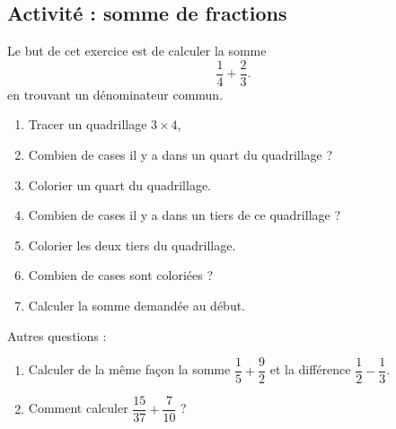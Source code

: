 
\subsection*{Activité : somme de fractions}

Le but de cet exercice est de calculer la somme
\begin{equation}
    \frac{1}{ 4 }+\frac{ 2 }{ 3 }.
\end{equation}
en trouvant un dénominateur commun.

\begin{enumerate}
    \item
        Tracer un quadrillage \( 3\times 4\),
    \item
        Combien de cases il y a dans un quart du quadrillage ?
    \item
        Colorier un quart du quadrillage.
    \item
        Combien de cases il y a dans un tiers de ce quadrillage ?
    \item
        Colorier les deux tiers du quadrillage.
    \item
        Combien de cases sont coloriées ?
    \item
        Calculer la somme demandée au début.
\end{enumerate}

Autres questions :
\begin{enumerate}
    \item
        
Calculer de la même façon la somme \( \dfrac{ 1 }{ 5 }+\dfrac{ 9 }{ 2 }\) et la différence \( \dfrac{ 1 }{ 2 }-\dfrac{ 1 }{ 3 }\).
 \item
     Comment calculer \( \dfrac{ 15 }{ 37 }+\dfrac{ 7 }{ 10 }\) ?
\end{enumerate}
